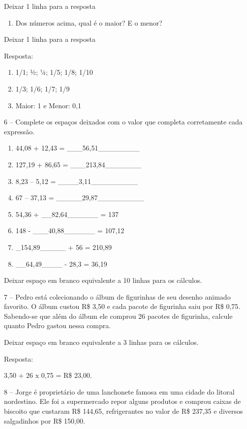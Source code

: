 Deixar 1 linha para a resposta

\begin{enumerate}
\def\labelenumi{\alph{enumi})}
\item
  Dos números acima, qual é o maior? E o menor?
\end{enumerate}

Deixar 1 linha para a resposta

Resposta:

\begin{enumerate}
\def\labelenumi{\alph{enumi})}
\item
  1/1; ½; ¼; 1/5; 1/8; 1/10
\item
  1/3; 1/6; 1/7; 1/9
\item
  Maior: 1 e Menor: 0,1
\end{enumerate}

6 -- Complete os espaços deixados com o valor que completa corretamente
cada expressão.

\begin{enumerate}
\def\labelenumi{\alph{enumi})}
\item
  44,08 + 12,43 = \_\_\_56,51\_\_\_\_\_\_\_\_
\item
  127,19 + 86,65 = \_\_\_213,84\_\_\_\_\_\_\_
\item
  8,23 -- 5,12 = \_\_\_\_3,11\_\_\_\_\_\_\_\_\_
\item
  67 -- 37,13 = \_\_\_\_\_29,87\_\_\_\_\_\_\_\_\_
\item
  54,36 + \_\_82,64\_\_\_\_\_\_ = 137
\item
  148 - \_\_\_40,88\_\_\_\_\_\_ = 107,12
\item
  \_154,89\_\_\_\_\_ + 56 = 210,89
\item
  \_\_64,49\_\_\_\_ - 28,3 = 36,19
\end{enumerate}

Deixar espaço em branco equivalente a 10 linhas para os cálculos.

7 -- Pedro está colecionando o álbum de figurinhas de seu desenho
animado favorito. O álbum custou R\$ 3,50 e cada pacote de figurinha
saiu por R\$ 0,75. Sabendo-se que além do álbum ele comprou 26 pacotes
de figurinha, calcule quanto Pedro gastou nessa compra.

Deixar espaço em branco equivalente a 3 linhas para os cálculos.

Resposta:

3,50 + 26 x 0,75 = R\$ 23,00.

8 -- Jorge é proprietário de uma lanchonete famosa em uma cidade do
litoral nordestino. Ele foi a supermercado repor alguns produtos e
comprou caixas de biscoito que custaram R\$ 144,65, refrigerantes no
valor de R\$ 237,35 e diversos salgadinhos por R\$ 150,00.

